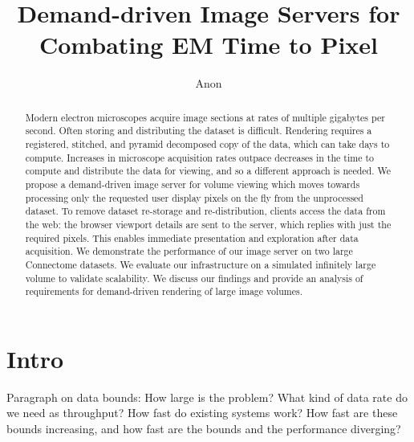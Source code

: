 \documentclass{llncs}
\begin{document}
%
\title{Demand-driven Image Servers for Combating EM Time to Pixel}
%
%
\author{Anon}
%
%
%

\maketitle              %

\begin{abstract}
Modern electron microscopes acquire image sections at rates of multiple gigabytes per second. Often storing and distributing the dataset is difficult. Rendering requires a registered, stitched, and pyramid decomposed copy of the data, which can take days to compute. Increases in microscope acquisition rates outpace decreases in the time to compute and distribute the data for viewing, and so a different approach is needed. We propose a demand-driven image server for volume viewing which moves towards processing only the requested user display pixels on the fly from the unprocessed dataset. To remove dataset re-storage and re-distribution, clients access the data from the web: the browser viewport details are sent to the server, which replies with just the required pixels. This enables immediate presentation and exploration after data acquisition. We demonstrate the performance of our image server on two large Connectome datasets. We evaluate our infrastructure on a simulated infinitely large volume to validate scalability. We discuss our findings and provide an analysis of requirements for demand-driven rendering of large image volumes.
\end{abstract}

%
\section{Intro}
Paragraph on data bounds: How large is the problem? What kind of data rate do we need as throughput? How fast do existing systems work? How fast are these bounds increasing, and how fast are the bounds and the performance diverging?
\end{document}
